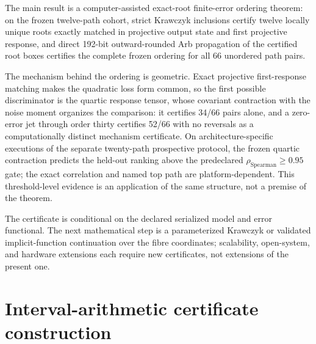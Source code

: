 The main result is a computer-assisted exact-root finite-error ordering theorem: on the
frozen twelve-path cohort, strict Krawczyk inclusions certify twelve locally unique roots
exactly matched in projective output state and first projective response, and direct
192-bit outward-rounded Arb propagation of the certified root boxes certifies the complete
frozen ordering for all 66 unordered path pairs.

The mechanism behind the ordering is geometric. Exact projective first-response matching
makes the quadratic loss form common, so the first possible discriminator is the quartic
response tensor, whose covariant contraction with the noise moment organizes the
comparison: it certifies 34/66 pairs alone, and a zero-error jet through order thirty
certifies 52/66 with no reversals as a computationally distinct mechanism certificate.
On architecture-specific executions of the separate twenty-path prospective protocol, the
frozen quartic contraction predicts the held-out ranking above the predeclared
$\rho_{\mathrm{Spearman}}\ge0.95$ gate; the exact correlation and named top path are
platform-dependent. This threshold-level evidence is an application of the same structure,
not a premise of the theorem.

The certificate is conditional on the declared serialized model and error functional. The
next mathematical step is a parameterized Krawczyk or validated implicit-function
continuation over the fibre coordinates; scalability, open-system, and hardware
extensions each require new certificates, not extensions of the present one.

\appendix

\section{Interval-arithmetic certificate construction}\label{app:interval}

